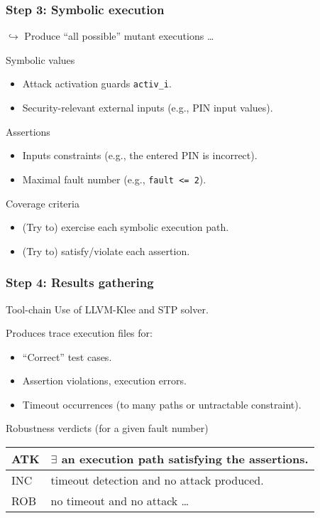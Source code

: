 \begin{frame} \frametitle{Step 3: Symbolic execution}
\vfill
$\hookrightarrow$ Produce ``all possible'' mutant executions \dots
\vfill
\begin{block}{Symbolic values}
\begin{itemize}
	\item Attack activation guards {\tt activ\_i}.
	\item Security-relevant external inputs (e.g., PIN input values).
\end{itemize}
\end{block}
\vfill
\begin{block}{Assertions}
\begin{itemize}
	\item Inputs constraints (e.g., the entered PIN is incorrect).
	\item Maximal fault number (e.g., {\tt fault <= 2}).
\end{itemize}
\end{block}
\vfill
\begin{block}{Coverage criteria}
\begin{itemize}
	\item (Try to) exercise each symbolic execution path.
	\item (Try to) satisfy/violate each assertion.
\end{itemize}
\end{block}
\vfill
\end{frame}

\begin{frame} \frametitle{Step 4: Results gathering} 
\vfill
\begin{block}{Tool-chain}
Use of LLVM-Klee and STP solver.
\end{block}
\vfill
\begin{block}{Produces trace execution files for:}
\begin{itemize}
\item ``Correct'' test cases.
\item Assertion violations, execution errors.
\item Timeout occurrences (to many paths or untractable constraint).
\end{itemize}
\end{block}
\vfill
\begin{block}{Robustness verdicts (for a given fault number)}
\begin{center}
\begin{tabular}{|l|l|}
\hline
ATK & $\exists$ an execution path satisfying the assertions. \\
\hline
INC & timeout detection and no attack produced. \\
\hline
ROB & no timeout and no attack \dots \\
\hline
\end{tabular}
\end{center}
\end{block}
\vfill
\end{frame}

